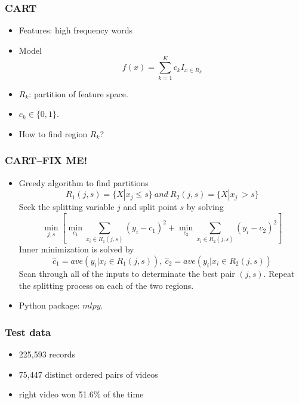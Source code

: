 \documentclass[fleqn]{beamer}
\begin{document}
\begin{frame}
\frametitle{CART}
    \begin{itemize}
     \item Features: high frequency words
     \item Model
     $$f(x) = \sum_{k=1}^K c_k I_{x \in R_k}$$
     \item $R_k$: partition of feature space. 
     \item $c_k \in \{0, 1\}$.
     \item How to find region $R_k$?
    \end{itemize}
\end{frame}
\begin{frame}
\frametitle{CART--FIX ME!}
  \begin{itemize}
   \item Greedy algorithm to find partitions
   $$R_1(j, s) = \{X|x_j \leq s\}\ and\ R_2(j, s) = \{X|x_j \ > s\}$$
   Seek the splitting variable $j$ and split point $s$ by solving
   $$\min_{j,s} [\min_{c_1} \sum_{x_i \in R_1(j, s)} (y_i - c_1)^2 + \min_{c_2} 
   \sum_{x_i \in R_2(j, s)} (y_i - c_2)^2]$$
   Inner minimization is solved by
   $$\hat{c}_1 = ave(y_i| x_i \in R_1(j,s)),\ \hat{c}_2 = ave(y_i|x_i \in R_2(j,s))$$
   Scan through all of the inputs to determinate the best pair $(j, s)$. 
   Repeat the splitting process on each of the two regions.
  \item Python package: $mlpy$.
  \end{itemize}

\end{frame}

\begin{frame}
\frametitle{Test data}
    \begin{itemize}
        \item 225,593 records
        \item 75,447 distinct ordered pairs of videos
        \item right video won 51.6\% of the time
    \end{itemize}

\end{frame}
\end{document}
